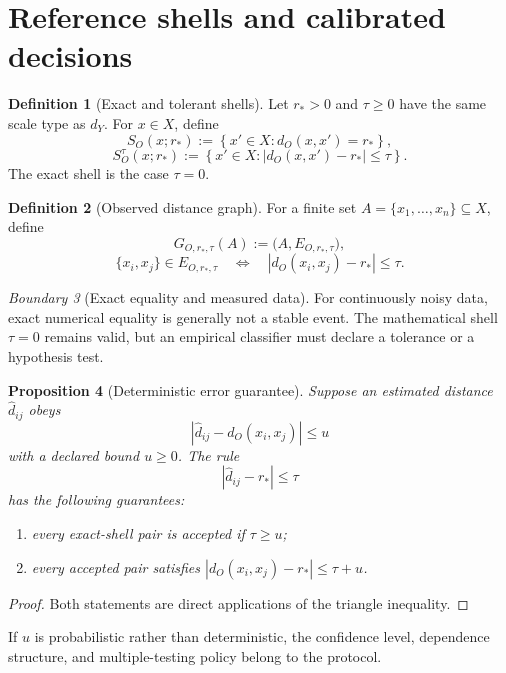 \documentclass[11pt,a4paper]{article}
\theoremstyle{definition}
\newtheorem{definition}{Definition}[section]
\theoremstyle{plain}
\newtheorem{proposition}[definition]{Proposition}
\theoremstyle{remark}
\newtheorem{warning}[definition]{Boundary}
\newcommand{\abs}[1]{\left\lvert #1\right\rvert}
\newcommand{\set}[1]{\left\{#1\right\}}
\begin{document}
\section{Reference shells and calibrated decisions}

\begin{definition}[Exact and tolerant shells]
Let $r_*>0$ and $\tau\geq0$ have the same scale type as $d_Y$. For
$x\in X$, define
\[
 S_O(x;r_*):=
 \set{x'\in X:d_O(x,x')=r_*},
\]
\[
 S_O^\tau(x;r_*):=
 \set{x'\in X:\abs{d_O(x,x')-r_*}\leq\tau}.
\]
The exact shell is the case $\tau=0$.
\end{definition}

\begin{definition}[Observed distance graph]
For a finite set $A=\{x_1,\ldots,x_n\}\subseteq X$, define
\[
 G_{O,r_*,\tau}(A)
 :=
 \bigl(A,E_{O,r_*,\tau}\bigr),
\]
\[
 \{x_i,x_j\}\in E_{O,r_*,\tau}
 \quad\Longleftrightarrow\quad
 \abs{d_O(x_i,x_j)-r_*}\leq\tau.
\]
\end{definition}

\begin{warning}[Exact equality and measured data]
For continuously noisy data, exact numerical equality is generally not a
stable event. The mathematical shell $\tau=0$ remains valid, but an
empirical classifier must declare a tolerance or a hypothesis test.
\end{warning}

\begin{proposition}[Deterministic error guarantee]
\label{prop:error}
Suppose an estimated distance $\widehat d_{ij}$ obeys
\[
 \abs{\widehat d_{ij}-d_O(x_i,x_j)}\leq u
\]
with a declared bound $u\geq0$. The rule
\[
 \abs{\widehat d_{ij}-r_*}\leq\tau
\]
has the following guarantees:
\begin{enumerate}[label=(\roman*)]
\item every exact-shell pair is accepted if $\tau\geq u$;
\item every accepted pair satisfies
      $\abs{d_O(x_i,x_j)-r_*}\leq\tau+u$.
\end{enumerate}
\end{proposition}

\begin{proof}
Both statements are direct applications of the triangle inequality.
\end{proof}

If $u$ is probabilistic rather than deterministic, the confidence level,
dependence structure, and multiple-testing policy belong to the protocol.
\end{document}
